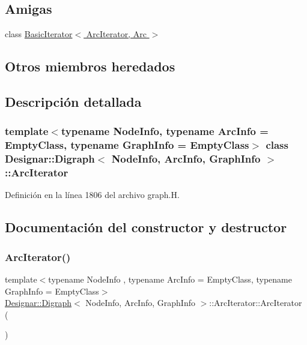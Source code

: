 \subsection*{Amigas}
\begin{DoxyCompactItemize}
\item 
class \hyperlink{class_designar_1_1_digraph_1_1_arc_iterator_a530ad7c7218fa9b74a5cce004d0e3a1c}{Basic\+Iterator$<$ Arc\+Iterator, Arc $>$}
\end{DoxyCompactItemize}
\subsection*{Otros miembros heredados}


\subsection{Descripción detallada}
\subsubsection*{template$<$typename Node\+Info, typename Arc\+Info = Empty\+Class, typename Graph\+Info = Empty\+Class$>$\newline
class Designar\+::\+Digraph$<$ Node\+Info, Arc\+Info, Graph\+Info $>$\+::\+Arc\+Iterator}



Definición en la línea 1806 del archivo graph.\+H.



\subsection{Documentación del constructor y destructor}
\mbox{\label{class_designar_1_1_digraph_1_1_arc_iterator_a0f540c556301e1d4e0a9d48433257b89}} 
\subsubsection{\texorpdfstring{Arc\+Iterator()}{ArcIterator()}\hspace{0.1cm}{\footnotesize\ttfamily [1/5]}}
{\footnotesize\ttfamily template$<$typename Node\+Info , typename Arc\+Info  = Empty\+Class, typename Graph\+Info  = Empty\+Class$>$ \\
\hyperlink{class_designar_1_1_digraph}{Designar\+::\+Digraph}$<$ Node\+Info, Arc\+Info, Graph\+Info $>$\+::Arc\+Iterator\+::\+Arc\+Iterator (\begin{DoxyParamCaption}{ }\end{DoxyParamCaption})\hspace{0.3cm}{\ttfamily [inline]}}




